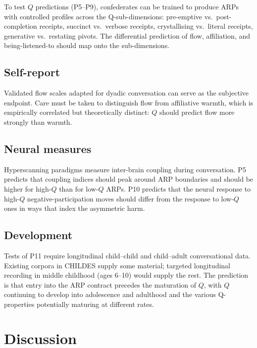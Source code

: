 To test $Q$ predictions (P5--P9), confederates can be trained to produce ARPs with controlled profiles across the Q-sub-dimensions: pre-emptive vs.\ post-completion receipts, succinct vs.\ verbose receipts, crystallising vs.\ literal receipts, generative vs.\ restating pivots. The differential prediction of flow, affiliation, and being-listened-to should map onto the sub-dimensions.

\subsection{Self-report}

Validated flow scales \citep{JacksonMarsh1996} adapted for dyadic conversation can serve as the subjective endpoint. Care must be taken to distinguish flow from affiliative warmth, which is empirically correlated but theoretically distinct: $Q$ should predict flow more strongly than warmth.

\subsection{Neural measures}

Hyperscanning paradigms \citep{Stephens2010,Liu2017} measure inter-brain coupling during conversation. P5 predicts that coupling indices should peak around ARP boundaries and should be higher for high-$Q$ than for low-$Q$ ARPs. P10 predicts that the neural response to high-$Q$ negative-participation moves should differ from the response to low-$Q$ ones in ways that index the asymmetric harm.

\subsection{Development}

Tests of P11 require longitudinal child--child and child--adult conversational data. Existing corpora in CHILDES supply some material; targeted longitudinal recording in middle childhood (ages 6--10) would supply the rest. The prediction is that entry into the ARP contract precedes the maturation of $Q$, with $Q$ continuing to develop into adolescence and adulthood and the various Q-properties potentially maturing at different rates.

\section{Discussion}\label{sec:discussion}

